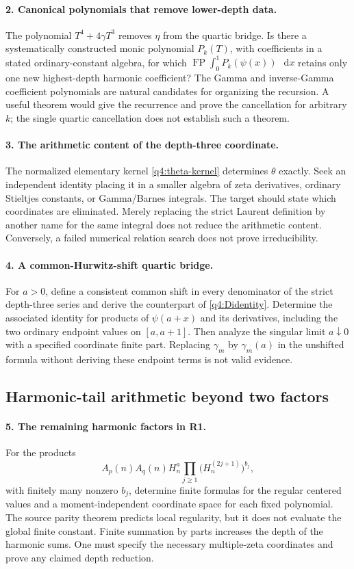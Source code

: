 \documentclass[11pt,a4paper]{article}
\numberwithin{equation}{section}
\theoremstyle{definition}
\theoremstyle{remark}
\DeclareMathOperator{\FP}{FP}
\newcommand{\dd}{\mathop{}\!\mathrm{d}}
\begin{document}
\paragraph{2. Canonical polynomials that remove lower-depth data.}
The polynomial $T^4+4\gamma T^3$ removes $\eta$ from the quartic
bridge. Is there a systematically constructed monic polynomial
$P_k(T)$, with coefficients in a stated ordinary-constant algebra,
for which $\FP\int_0^1P_k(\psi(x))\,\dd x$ retains only one
new highest-depth harmonic coefficient? The Gamma and inverse-Gamma
coefficient polynomials are natural candidates for organizing the
recursion. A useful theorem would give the recurrence and prove
the cancellation for arbitrary $k$; the single quartic cancellation
does not establish such a theorem.

\paragraph{3. The arithmetic content of the depth-three coordinate.}
The normalized elementary kernel \eqref{q4:theta-kernel} determines
$\theta$ exactly. Seek an independent identity placing it in a
smaller algebra of zeta derivatives, ordinary Stieltjes constants,
or Gamma/Barnes integrals. The target should state which coordinates
are eliminated. Merely replacing the strict Laurent definition
by another name for the same integral does not reduce the
arithmetic content. Conversely, a failed numerical relation search
does not prove irreducibility.

\paragraph{4. A common-Hurwitz-shift quartic bridge.}
For $a>0$, define a consistent common shift in every denominator
of the strict depth-three series and derive the counterpart of
\eqref{q4:Didentity}. Determine the associated identity for
products of $\psi(a+x)$ and its derivatives, including the two
ordinary endpoint values on $[a,a+1]$. Then analyze the singular
limit $a\downarrow0$ with a specified coordinate finite part.
Replacing $\gamma_m$ by $\gamma_m(a)$ in the unshifted formula
without deriving these endpoint terms is not valid evidence.

\subsection{Harmonic-tail arithmetic beyond two factors}

\paragraph{5. The remaining harmonic factors in R1.}
For the products
\[
A_p(n)A_q(n)H_n^a
\prod_{j\ge1}\bigl(H_n^{(2j+1)}\bigr)^{b_j},
\]
with finitely many nonzero $b_j$, determine finite formulas for
the regular centered values and a moment-independent coordinate
space for each fixed polynomial. The source parity theorem predicts
local regularity, but it does not evaluate the global finite
constant. Finite summation by parts increases the depth of the
harmonic sums. One must specify the necessary multiple-zeta
coordinates and prove any claimed depth reduction.
\end{document}
